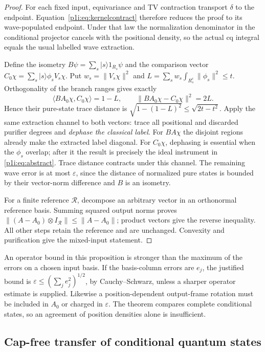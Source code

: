 \documentclass[11pt]{article}
\numberwithin{equation}{section}
\theoremstyle{definition}
\theoremstyle{remark}
\begin{document}
\begin{proof}
For each fixed input, equivariance and TV contraction transport
$\delta$ to the endpoint. Equation~\eqref{p1i:eq:kernelcontract} therefore
reduces the proof to its wave-populated endpoint. Under that law the
normalization denominator in the conditional projector cancels with
the positional density, so the actual cq integral equals the usual
labelled wave extraction.

Define the isometry $B\psi=\sum_s|s\rangle 1_{R_s}\psi$ and the
comparison vector $C_0\chi=\sum_s|s\rangle\phi_s V_s\chi$. Put
$w_s=\|V_s\chi\|^2$ and
$L=\sum_s w_s\int_{R_s^c}\|\phi_s\|^2\leq t$.
Orthogonality of the branch ranges gives exactly
\[
 \langle BA_0\chi,C_0\chi\rangle=1-L,
 \qquad \|BA_0\chi-C_0\chi\|^2=2L.
\]
Hence their pure-state trace distance is
$\sqrt{1-(1-L)^2}\leq\sqrt{2t-t^2}$.
Apply the same extraction channel to both vectors: trace all positional
and discarded purifier degrees and \emph{dephase the classical label}.
For $BA\chi$ the disjoint regions already make the extracted label
diagonal. For $C_0\chi$, dephasing is essential when the $\phi_s$ overlap;
after it the result is precisely the ideal instrument in
\eqref{p1i:eq:abstract}. Trace distance contracts under this channel.
The remaining wave error is at most $\varepsilon$, since the distance
of normalized pure states is bounded by their vector-norm difference
and $B$ is an isometry.

For a finite reference $\mathcal R$, decompose an arbitrary vector in an
orthonormal reference basis. Summing squared output norms proves
$\|(A-A_0)\otimes I_{\mathcal R}\|\leq\|A-A_0\|$; product vectors give
the reverse inequality. All other steps retain the reference and are
unchanged. Convexity and purification give the mixed-input statement.
\end{proof}

An operator bound in this proposition is stronger than the maximum of
the errors on a chosen input basis. If the basis-column errors are
$e_j$, the justified bound is $\varepsilon\leq(\sum_j e_j^2)^{1/2}$,
by Cauchy--Schwarz, unless a sharper operator estimate is supplied.
Likewise a position-dependent output-frame rotation must be included in
$A_0$ or charged in $\varepsilon$. The theorem compares complete
conditional states, so an agreement of position densities alone is
insufficient.

\subsection{Cap-free transfer of conditional quantum states}
\end{document}
